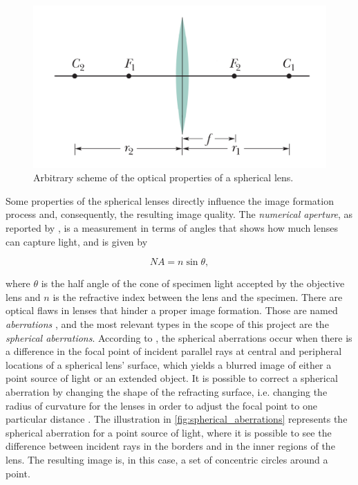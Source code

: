 \begin{figure}[htb]
	\centering
	\caption{\label{fig:spherical_lens} Arbitrary scheme of the optical properties of a spherical lens.}
	\begin{center}
	    \includegraphics[scale=0.4]{images/fig4.png}
	\end{center}
	\centering
\end{figure}

Some properties of the spherical lenses directly influence the image formation process and, consequently, the resulting image quality. The \emph{numerical aperture}, as reported by , is a measurement in terms of angles that shows how much lenses can capture light, and is given by

\begin{equation}
    \label{eqn:numerical_aperture}
    NA = n \sin{\theta},
\end{equation}

\noindent where $\theta$ is the half angle of the cone of specimen light accepted by the objective lens and $n$ is the refractive index between the lens and the specimen. There are optical flaws in lenses that hinder a proper image formation. Those are named \emph{aberrations} \cite{lawlor2019introduction}, and the most relevant types in the scope of this project are the \emph{spherical aberrations}. According to , the spherical aberrations occur when there is a difference in the focal point of incident parallel rays at central and peripheral locations of a spherical lens' surface, which yields a blurred image of either a point source of light or an extended object. It is possible to correct a spherical aberration by changing the shape of the refracting surface, i.e. changing the radius of curvature for the lenses in order to adjust the focal point to one particular distance \cite{smith1988optics}. The illustration in \autoref{fig:spherical_aberrations} represents the spherical aberration for a point source of light, where it is possible to see the difference between incident rays in the borders and in the inner regions of the lens. The resulting image is, in this case, a set of concentric circles around a point.

